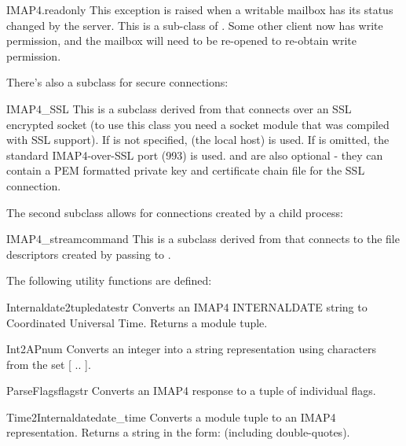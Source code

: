 \begin{excdesc}{IMAP4.readonly}
This exception is raised when a writable mailbox has its status changed by the server.  This is a
sub-class of .  Some other client now has write permission,
and the mailbox will need to be re-opened to re-obtain write permission.
\end{excdesc}

There's also a subclass for secure connections:

\begin{classdesc}{IMAP4_SSL}{}
This is a subclass derived from  that connects over an SSL encrypted socket 
(to use this class you need a socket module that was compiled with SSL support).
If  is not specified,  (the local host) is used.
If  is omitted, the standard IMAP4-over-SSL port (993) is used.
 and  are also optional - they can contain a PEM formatted
private key and certificate chain file for the SSL connection. 
\end{classdesc}

The second subclass allows for connections created by a child process:

\begin{classdesc}{IMAP4_stream}{command}
This is a subclass derived from  that connects
to the  file descriptors created by passing  to .
\end{classdesc}

The following utility functions are defined:

\begin{funcdesc}{Internaldate2tuple}{datestr}
  Converts an IMAP4 INTERNALDATE string to Coordinated Universal
  Time. Returns a  module tuple.
\end{funcdesc}

\begin{funcdesc}{Int2AP}{num}
  Converts an integer into a string representation using characters
  from the set [ .. ].
\end{funcdesc}

\begin{funcdesc}{ParseFlags}{flagstr}
  Converts an IMAP4  response to a tuple of individual
  flags.
\end{funcdesc}

\begin{funcdesc}{Time2Internaldate}{date_time}
  Converts a  module tuple to an IMAP4
   representation.  Returns a string in the form:
   (including double-quotes).
\end{funcdesc}


